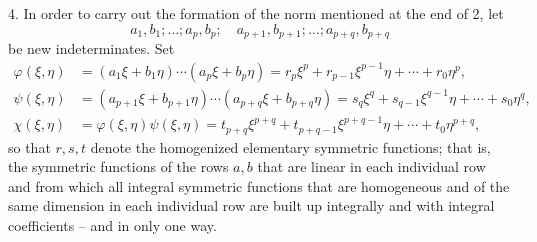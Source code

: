 \documentclass[11pt]{article}
\begin{document}
4. In order to carry out the formation of the norm mentioned at the end of 2, let
\[
 a_1,b_1;\ldots; a_p,b_p;\quad a_{p+1},b_{p+1};\ldots; a_{p+q},b_{p+q}
\]
be new indeterminates. Set
\begin{equation}
\begin{aligned}
 \varphi(\xi,\eta)&=(a_1\xi+b_1\eta)\cdots(a_p\xi+b_p\eta)
     =r_p\xi^p+r_{p-1}\xi^{p-1}\eta+\cdots+r_0\eta^p,\\
 \psi(\xi,\eta)&=(a_{p+1}\xi+b_{p+1}\eta)\cdots(a_{p+q}\xi+b_{p+q}\eta)
     =s_q\xi^q+s_{q-1}\xi^{q-1}\eta+\cdots+s_0\eta^q,\\
 \chi(\xi,\eta)&=\varphi(\xi,\eta)\psi(\xi,\eta)
     =t_{p+q}\xi^{p+q}+t_{p+q-1}\xi^{p+q-1}\eta+\cdots+t_0\eta^{p+q},
\end{aligned}
\tag{8}
\end{equation}
so that $r,s,t$ denote the homogenized elementary symmetric functions; that is, the symmetric functions of the rows $a,b$ that are linear in each individual row and from which all integral symmetric functions that are homogeneous and of the same dimension in each individual row are built up integrally and with integral coefficients -- and in only one way.
\end{document}
